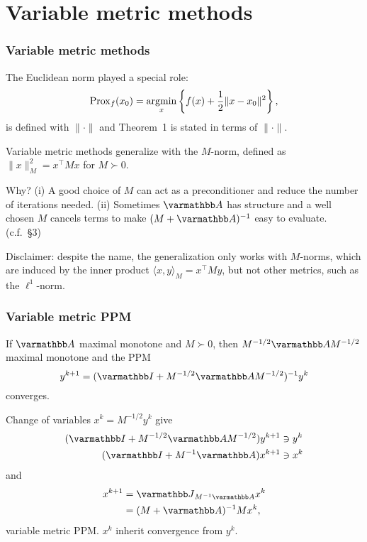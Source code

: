 \documentclass[10pt,mathserif]{beamer}
\begin{document}
\section{Variable metric methods}
\begin{frame}
\frametitle{Variable metric methods}
The Euclidean norm played a special role:
\[
\mathrm{Prox}_{f}(x_0)=\operatorname*{argmin}_{x}\left\{f(x)+\frac{1}{2}\|x-x_0\|^2\right\},
\]
is defined with $\|\cdot\|$ and Theorem~1 is stated in terms of $\|\cdot\|$.

\vspace{0.2in}
Variable metric methods generalize with the $M$-norm, defined as $\|x\|_M^2=x^\intercal Mx$ for $M\succ 0$.
\vspace{0.2in}

Why?
(i) A good choice of $M$ can act as a preconditioner and reduce the number of iterations needed.
(ii) Sometimes $\opA$ has structure and a well chosen $M$ cancels terms to make $(M+ \opA)^{-1}$ easy to evaluate.
(c.f.\ \S3)

\vspace{0.2in}
Disclaimer: despite the name, the generalization only works with $M$-norms, which are induced by the inner product $\langle x,y\rangle_M=x^\intercal My$, but not other metrics, such as the $\ell^1$-norm.
\end{frame}


\begin{frame}
\frametitle{Variable metric PPM}
If $\opA$ maximal monotone and $M\succ 0$, then $M^{-1/2}\opA M^{-1/2}$ maximal monotone
and the PPM
\[
y^{k+1}=(\opI + M^{-1/2}\opA M^{-1/2})^{-1}y^k
\]
converges.

\vspace{0.2in}
Change of variables $x^k=M^{-1/2}y^k$ give
\begin{align*}
(\opI +
 M^{-1/2}\opA M^{-1/2})y^{k+1}
&\ni y^k\\
(\opI +
 M^{-1} \opA )x^{k+1}
&\ni x^k
\end{align*}
and
\begin{align*}
x^{k+1}&=\opJ_{M^{-1}\opA }
x^k\\
&=
(M+ \opA )^{-1}
M x^k,
\end{align*}
variable metric PPM.
$x^k$ inherit convergence from $y^k$.


\end{frame}
\end{document}
